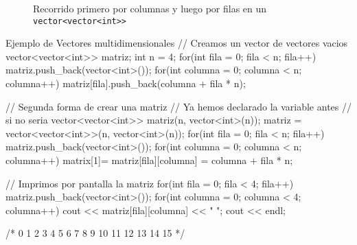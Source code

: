 \documentclass{article}
\begin{document}
    \begin{figure}[h]
        \centering
        \caption{Recorrido primero por columnas y luego por filas en un \texttt{vector<vector<int>>}}
    \end{figure}

    \begin{codelisting}{Ejemplo de Vectores multidimensionales}
// Creamos un vector de vectores vacios
vector<vector<int>> matriz;
int n = 4;
for(int fila = 0; fila < n; fila++) {
    matriz.push_back(vector<int>());
    for(int columna = 0; columna < n; columna++) {
        matriz[fila].push_back(columna + fila * n);
    }
}

// Segunda forma de crear una matriz
// Ya hemos declarado la variable antes
// si no seria vector<vector<int>> matriz(n, vector<int>(n));
matriz = vector<vector<int>>(n, vector<int>(n)); 
for(int fila = 0; fila < n; fila++) {
    matriz.push_back(vector<int>());
    for(int columna = 0; columna < n; columna++) {matrix[1]=
        matriz[fila][columna] = columna + fila * n;
    }
}

// Imprimos por pantalla la matriz
for(int fila = 0; fila < 4; fila++) {
    matriz.push_back(vector<int>());
    for(int columna = 0; columna < 4; columna++) {
        cout << matriz[fila][columna] << " ";
    }
    cout << endl;
}

/*
    0 1 2 3 
    4 5 6 7 
    8 9 10 11 
    12 13 14 15
*/
    \end{codelisting}
\end{document}

